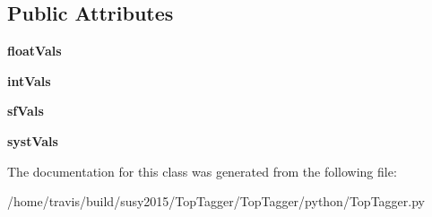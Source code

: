 \subsection*{Public Attributes}
\begin{DoxyCompactItemize}
\item 
\hypertarget{classTopTagger_1_1TopTaggerResult_a3e180987b6abcfe7cc7c40b199f0c386}{{\bfseries float\-Vals}}\label{classTopTagger_1_1TopTaggerResult_a3e180987b6abcfe7cc7c40b199f0c386}

\item 
\hypertarget{classTopTagger_1_1TopTaggerResult_a6cf9e0d32998c8ac16efaaa4ae32c2ad}{{\bfseries int\-Vals}}\label{classTopTagger_1_1TopTaggerResult_a6cf9e0d32998c8ac16efaaa4ae32c2ad}

\item 
\hypertarget{classTopTagger_1_1TopTaggerResult_a46e53d5ef65067c797f8d11644d9100a}{{\bfseries sf\-Vals}}\label{classTopTagger_1_1TopTaggerResult_a46e53d5ef65067c797f8d11644d9100a}

\item 
\hypertarget{classTopTagger_1_1TopTaggerResult_a689adeafa68d3a7e63a9f8f271786ef4}{{\bfseries syst\-Vals}}\label{classTopTagger_1_1TopTaggerResult_a689adeafa68d3a7e63a9f8f271786ef4}

\end{DoxyCompactItemize}


The documentation for this class was generated from the following file\-:\begin{DoxyCompactItemize}
\item 
/home/travis/build/susy2015/\-Top\-Tagger/\-Top\-Tagger/python/Top\-Tagger.\-py\end{DoxyCompactItemize}
